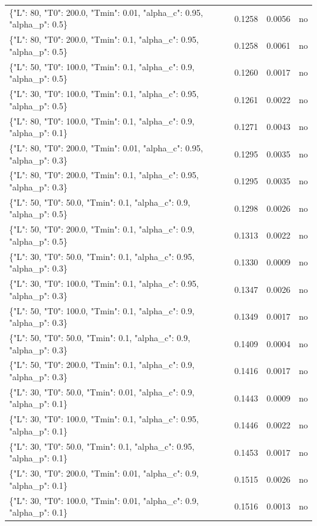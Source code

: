 \begin{table}[htbp]
\begin{tabular}{lrrr}
\{"L": 80, "T0": 200.0, "Tmin": 0.01, "alpha\_c": 0.95, "alpha\_p": 0.5\} & 0.1258 & 0.0056 & no \\
\{"L": 80, "T0": 200.0, "Tmin": 0.1, "alpha\_c": 0.95, "alpha\_p": 0.5\} & 0.1258 & 0.0061 & no \\
\{"L": 50, "T0": 100.0, "Tmin": 0.1, "alpha\_c": 0.9, "alpha\_p": 0.5\} & 0.1260 & 0.0017 & no \\
\{"L": 30, "T0": 100.0, "Tmin": 0.1, "alpha\_c": 0.95, "alpha\_p": 0.5\} & 0.1261 & 0.0022 & no \\
\{"L": 80, "T0": 100.0, "Tmin": 0.1, "alpha\_c": 0.9, "alpha\_p": 0.1\} & 0.1271 & 0.0043 & no \\
\{"L": 80, "T0": 200.0, "Tmin": 0.01, "alpha\_c": 0.95, "alpha\_p": 0.3\} & 0.1295 & 0.0035 & no \\
\{"L": 80, "T0": 200.0, "Tmin": 0.1, "alpha\_c": 0.95, "alpha\_p": 0.3\} & 0.1295 & 0.0035 & no \\
\{"L": 50, "T0": 50.0, "Tmin": 0.1, "alpha\_c": 0.9, "alpha\_p": 0.5\} & 0.1298 & 0.0026 & no \\
\{"L": 50, "T0": 200.0, "Tmin": 0.1, "alpha\_c": 0.9, "alpha\_p": 0.5\} & 0.1313 & 0.0022 & no \\
\{"L": 30, "T0": 50.0, "Tmin": 0.1, "alpha\_c": 0.95, "alpha\_p": 0.3\} & 0.1330 & 0.0009 & no \\
\{"L": 30, "T0": 100.0, "Tmin": 0.1, "alpha\_c": 0.95, "alpha\_p": 0.3\} & 0.1347 & 0.0026 & no \\
\{"L": 50, "T0": 100.0, "Tmin": 0.1, "alpha\_c": 0.9, "alpha\_p": 0.3\} & 0.1349 & 0.0017 & no \\
\{"L": 50, "T0": 50.0, "Tmin": 0.1, "alpha\_c": 0.9, "alpha\_p": 0.3\} & 0.1409 & 0.0004 & no \\
\{"L": 50, "T0": 200.0, "Tmin": 0.1, "alpha\_c": 0.9, "alpha\_p": 0.3\} & 0.1416 & 0.0017 & no \\
\{"L": 30, "T0": 50.0, "Tmin": 0.01, "alpha\_c": 0.9, "alpha\_p": 0.1\} & 0.1443 & 0.0009 & no \\
\{"L": 30, "T0": 100.0, "Tmin": 0.1, "alpha\_c": 0.95, "alpha\_p": 0.1\} & 0.1446 & 0.0022 & no \\
\{"L": 30, "T0": 50.0, "Tmin": 0.1, "alpha\_c": 0.95, "alpha\_p": 0.1\} & 0.1453 & 0.0017 & no \\
\{"L": 30, "T0": 200.0, "Tmin": 0.01, "alpha\_c": 0.9, "alpha\_p": 0.1\} & 0.1515 & 0.0026 & no \\
\{"L": 30, "T0": 100.0, "Tmin": 0.01, "alpha\_c": 0.9, "alpha\_p": 0.1\} & 0.1516 & 0.0013 & no \\

\end{tabular}
\end{table}
